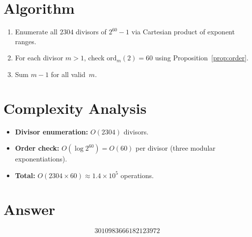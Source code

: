 \documentclass[11pt]{article}
\begin{document}
\section{Algorithm}

\begin{enumerate}
\item Enumerate all $2304$ divisors of $2^{60}-1$ via Cartesian product of exponent ranges.
\item For each divisor $m > 1$, check $\mathrm{ord}_m(2) = 60$ using Proposition~\ref{prop:order}.
\item Sum $m - 1$ for all valid~$m$.
\end{enumerate}

\section{Complexity Analysis}

\begin{itemize}
\item \textbf{Divisor enumeration:} $O(2304)$ divisors.
\item \textbf{Order check:} $O(\log 2^{60}) = O(60)$ per divisor (three modular exponentiations).
\item \textbf{Total:} $O(2304 \times 60) \approx 1.4 \times 10^5$ operations.
\end{itemize}

\section{Answer}

\[
\boxed{3010983666182123972}
\]
\end{document}

